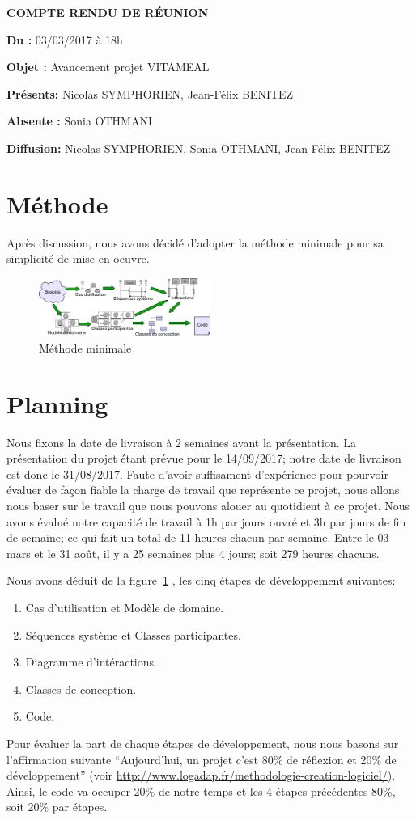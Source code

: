 \documentclass[11pt,a4paper,french,twoside,openright]{article}
\begin{document}
\pagestyle{fancy}

\begin{center}\bfseries\Huge
COMPTE RENDU DE RÉUNION
\end{center}

\textbf{Du      :} 03/03/2017 à 18h

\textbf{Objet   :} Avancement projet VITAMEAL

\textbf{Présents:} Nicolas SYMPHORIEN, Jean-Félix BENITEZ

\textbf{Absente :} Sonia OTHMANI

\textbf{Diffusion:} Nicolas SYMPHORIEN, Sonia OTHMANI, Jean-Félix BENITEZ

\hrulefill

\section{Méthode}
Après discussion, nous avons décidé d'adopter la méthode minimale pour sa simplicité de mise en oeuvre.
\begin{figure}[!ht]
\label{Mmin}
  \centering
      \includegraphics[width=0.5\textwidth]{MethodeMinimale}
\caption{Méthode minimale}
\end{figure}

\section{Planning}
Nous fixons la date de livraison à 2 semaines avant la présentation. La présentation du projet étant prévue pour le 14/09/2017; notre date de livraison est donc le 31/08/2017. Faute d'avoir suffisament d'expérience pour pourvoir évaluer de façon fiable la charge de travail que représente ce projet, nous allons nous baser sur le travail que nous pouvons alouer au quotidient à ce projet. Nous avons évalué notre capacité de travail à 1h par jours ouvré et 3h par jours de fin de semaine; ce qui fait un total de 11 heures chacun par semaine. Entre le 03 mars et le 31 août, il y a 25 semaines plus 4 jours; soit 279 heures chacuns.

Nous avons déduit de la figure~\ref{Mmin} , les cinq étapes de développement suivantes:
\begin{enumerate}
\item Cas d'utilisation et Modèle de domaine.
\item Séquences système et Classes participantes.
\item Diagramme d'intéractions.
\item Classes de conception.
\item Code.
\end{enumerate}
Pour évaluer la part de chaque étapes de développement, nous nous basons sur l'affirmation suivante \enquote{Aujourd'hui, un projet c'est 80\% de réflexion et 20\% de développement} (voir \url{http://www.logadap.fr/methodologie-creation-logiciel/}). Ainsi, le code va occuper 20\% de notre temps et les 4 étapes précédentes 80\%, soit 20\% par étapes.
\end{document}
